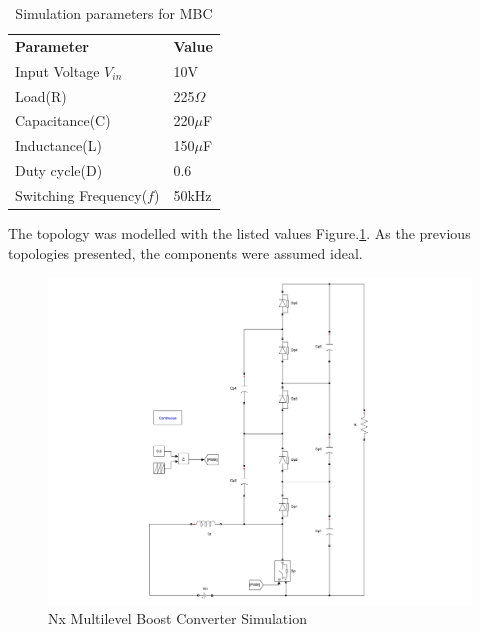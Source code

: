 \begin{table}[H]
\begin{center}
\caption {Simulation parameters for MBC} \label{tab:MBC} 
\begin{tabular}{|l|l|}
\cline{1-2}
\textbf{Parameter} & \textbf{Value}  \\ \cline{1-2}
Input Voltage $V_{in}$          &      10V   \\ \cline{1-2}
Load(R)   & 225$\Omega$           \\ \cline{1-2}
Capacitance(C)          &       220$\mu$F     \\ \cline{1-2}
Inductance(L)          &      150$\mu$F      \\ \cline{1-2}
Duty cycle(D)          &     0.6       \\ \cline{1-2}
Switching Frequency($f$)          &      50kHz      \\ \cline{1-2}
\end{tabular}
\end{center}
\end{table}
\vspace{-6mm}
The  topology was modelled with the listed values Figure.\ref{fig:MBC_Sim}. As the previous topologies presented, the components were assumed ideal.
\vspace{-4mm}
\begin{figure}[H]
   \centering
   \includegraphics[width=\textwidth]{figures/yMultilevel/MCB_Simulation.pdf}
   \vspace{-4mm}
    \caption{Nx Multilevel Boost Converter Simulation}
	\label{fig:MBC_Sim}
\end{figure}
